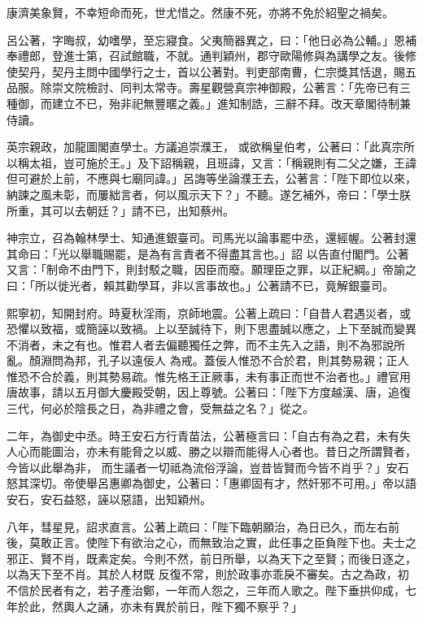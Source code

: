 \begin{pinyinscope}
 康濟美象賢，不幸短命而死，世尤惜之。然康不死，亦將不免於紹聖之禍矣。



 呂公著，字晦叔，幼嗜學，至忘寢食。父夷簡器異之，曰：「他日必為公輔。」恩補奉禮郎，登進士第，召試館職，不就。通判穎州，郡守歐陽修與為講學之友。後修使契丹，契丹主問中國學行之士，首以公著對。判吏部南曹，仁宗獎其恬退，賜五品服。除崇文院檢討、同判太常寺。壽星觀營真宗神御殿，公著言：「先帝已有三種御，而建立不已，殆非祀無豐暱之義。」進知制誥，三辭不拜。改天章閣待制兼侍讀。



 英宗親政，加龍圖閣直學士。方議追崇濮王，
 或欲稱皇伯考，公著曰：「此真宗所以稱太祖，豈可施於王。」及下詔稱親，且班諱，又言：「稱親則有二父之嫌，王諱但可避於上前，不應與七廟同諱。」呂誨等坐論濮王去，公著言：「陛下即位以來，納諫之風未彰，而屢絀言者，何以風示天下？」不聽。遂乞補外，帝曰：「學士朕所重，其可以去朝廷？」請不已，出知蔡州。



 神宗立，召為翰林學士、知通進銀臺司。司馬光以論事罷中丞，還經幄。公著封還其命曰：「光以舉職賜罷，是為有言責者不得盡其言也。」詔
 以告直付閣門。公著又言：「制命不由門下，則封駁之職，因臣而廢。願理臣之罪，以正紀綱。」帝諭之曰：「所以徙光者，賴其勸學耳，非以言事故也。」公著請不已，竟解銀臺司。



 熙寧初，知開封府。時夏秋淫雨，京師地震。公著上疏曰：「自昔人君遇災者，或恐懼以致福，或簡誣以致禍。上以至誠待下，則下思盡誠以應之，上下至誠而變異不消者，未之有也。惟君人者去偏聽獨任之弊，而不主先入之語，則不為邪說所亂。顏淵問為邦，孔子以遠佞人
 為戒。蓋佞人惟恐不合於君，則其勢易親；正人惟恐不合於義，則其勢易疏。惟先格王正厥事，未有事正而世不治者也。」禮官用唐故事，請以五月御大慶殿受朝，因上尊號。公著曰：「陛下方度越漢、唐，追復三代，何必於陰長之日，為非禮之會，受無益之名？」從之。



 二年，為御史中丞。時王安石方行青苗法，公著極言曰：「自古有為之君，未有失人心而能圖治，亦未有能脅之以威、勝之以辯而能得人心者也。昔日之所謂賢者，今皆以此舉為非，
 而生議者一切祗為流俗浮論，豈昔皆賢而今皆不肖乎？」安石怒其深切。帝使舉呂惠卿為御史，公著曰：「惠卿固有才，然奸邪不可用。」帝以語安石，安石益怒，誣以惡語，出知穎州。



 八年，彗星見，詔求直言。公著上疏曰：「陛下臨朝願治，為日已久，而左右前後，莫敢正言。使陛下有欲治之心，而無致治之實，此任事之臣負陛下也。夫士之邪正、賢不肖，既素定矣。今則不然，前日所舉，以為天下之至賢；而後日逐之，以為天下至不肖。其於人材既
 反復不常，則於政事亦乖戾不審矣。古之為政，初不信於民者有之，若子產治鄭，一年而人怨之，三年而人歌之。陛下垂拱仰成，七年於此，然輿人之誦，亦未有異於前日，陛下獨不察乎？」




\end{pinyinscope}
